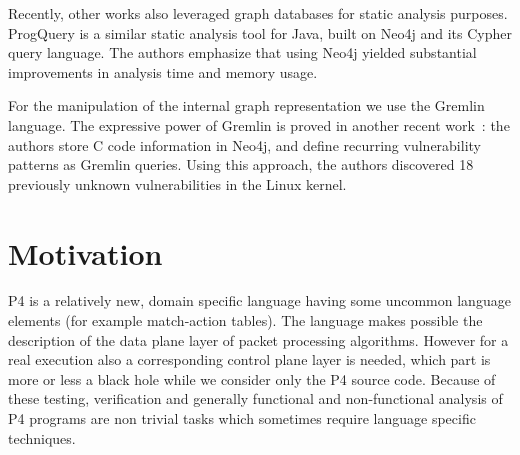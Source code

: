 \documentclass[sigconf]{acmart}
\begin{document}
  Recently, other works also leveraged graph databases for static analysis purposes. ProgQuery \cite{java-static} is a similar static analysis tool for Java, built on Neo4j and its Cypher query language. The authors emphasize that using Neo4j yielded substantial improvements in analysis time and memory usage. 
  
  For the manipulation of the internal graph representation we use the Gremlin language. The expressive power of Gremlin is proved in another recent work~\cite{yamaguchi}: the authors store C code information in Neo4j, and define recurring vulnerability patterns as Gremlin queries. Using this approach, the authors discovered 18 previously unknown vulnerabilities in the Linux kernel.
	
  


	\section{Motivation}
	


P4 is a relatively new, domain specific language having some uncommon language elements (for example match-action tables). The language makes possible the description of the data plane layer of packet processing algorithms. However for a real execution also a corresponding control plane layer is needed, which part is more or less a black hole while we consider only the P4 source code. Because of these testing, verification and generally functional and non-functional analysis of P4 programs are non trivial tasks which sometimes require language specific techniques.   
\end{document}
